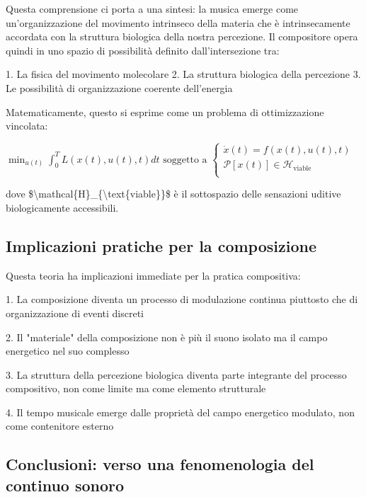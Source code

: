\documentclass[a4paper,11pt]{article}
\begin{document}
Questa comprensione ci porta a una sintesi: la musica emerge come
un'organizzazione del movimento intrinseco della materia che è
intrinsecamente accordata con la struttura biologica della nostra
percezione. Il compositore opera quindi in uno spazio di possibilità
definito dall'intersezione tra:

1. La fisica del movimento molecolare 2. La struttura biologica della
percezione 3. Le possibilità di organizzazione coerente dell'energia

Matematicamente, questo si esprime come un problema di ottimizzazione
vincolata:

$\min_{u(t)} \int_0^T L(x(t), u(t), t)dt$
$\text{soggetto a } \begin{cases}
\dot{x}(t) = f(x(t), u(t), t) \\
\mathcal{P}[x(t)] \in \mathcal{H}_{\text{viable}} \\
\end{cases}$

dove \$\textbackslash{}mathcal\{H\}\_\{\textbackslash{}text\{viable\}\}\$ è il sottospazio delle sensazioni
uditive biologicamente accessibili.

\subsection{Implicazioni pratiche per la composizione}\hypertarget{implicazioni-pratiche-per-la-composizione}{}\label{implicazioni-pratiche-per-la-composizione}

Questa teoria ha implicazioni immediate per la pratica compositiva:

1. La composizione diventa un processo di modulazione continua
piuttosto che di organizzazione di eventi discreti

2. Il "materiale" della composizione non è più il suono isolato ma il
campo energetico nel suo complesso

3. La struttura della percezione biologica diventa parte integrante del
processo compositivo, non come limite ma come elemento strutturale

4. Il tempo musicale emerge dalle proprietà del campo energetico
modulato, non come contenitore esterno

\subsection{Conclusioni: verso una fenomenologia del continuo sonoro}\hypertarget{conclusioni-verso-una-fenomenologia-del-continuo-sonoro}{}\label{conclusioni-verso-una-fenomenologia-del-continuo-sonoro}
\end{document}
